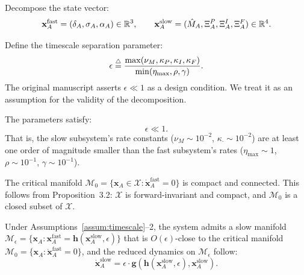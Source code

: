 
\begin{definition}
Decompose the state vector:
\[
\mathbf{x}_A^{\text{fast}} = (\delta_A, \sigma_A, \alpha_A) \in \mathbb{R}^3,
\qquad
\mathbf{x}_A^{\text{slow}} = (\hat{M}_A, \Xi_A^P, \Xi_A^I, \Xi_A^F) \in \mathbb{R}^4.
\]
\end{definition}

\begin{definition}
Define the timescale separation parameter:
\[
\epsilon \stackrel{\triangle}{=} \frac{\max(\nu_M, \kappa_P, \kappa_I, \kappa_F)}{\min(\eta_{\max}, \rho, \gamma)}.
\]
The original manuscript asserts $\epsilon \ll 1$ as a design condition.
We treat it as an assumption for the validity of the decomposition.
\end{definition}

\begin{assumption}
\label{assum:timescale}
The parameters satisfy:
\[
\epsilon \ll 1.
\]
That is, the slow subsystem's rate constants ($\nu_M \sim 10^{-2}$,
$\kappa_{\cdot} \sim 10^{-2}$) are at least one order of magnitude
smaller than the fast subsystem's rates ($\eta_{\max} \sim 1$,
$\rho \sim 10^{-1}$, $\gamma \sim 10^{-1}$).
\end{assumption}

\begin{assumption}
The critical manifold $\mathcal{M}_0 = \{ \mathbf{x}_A \in \mathcal{X} :
\dot{\mathbf{x}}_A^{\text{fast}} = 0 \}$ is compact and connected.
This follows from Proposition~3.2: $\mathcal{X}$ is forward-invariant
and compact, and $\mathcal{M}_0$ is a closed subset of $\mathcal{X}$.
\end{assumption}

\begin{proposition}
\label{prop:fenichel}
Under Assumptions~\ref{assum:timescale}--2, the system admits a slow
manifold $\mathcal{M}_\epsilon = \{ \mathbf{x}_A :
\mathbf{x}_A^{\text{fast}} = \mathbf{h}(\mathbf{x}_A^{\text{slow}}, \epsilon) \}$
that is $O(\epsilon)$-close to the critical manifold
$\mathcal{M}_0 = \{ \mathbf{x}_A : \dot{\mathbf{x}}_A^{\text{fast}} = 0 \}$,
and the reduced dynamics on $\mathcal{M}_\epsilon$ follow:
\[
\dot{\mathbf{x}}_A^{\text{slow}} = \epsilon \cdot
\mathbf{g}(\mathbf{h}(\mathbf{x}_A^{\text{slow}}, \epsilon),
\mathbf{x}_A^{\text{slow}}).
\]
\end{proposition}

